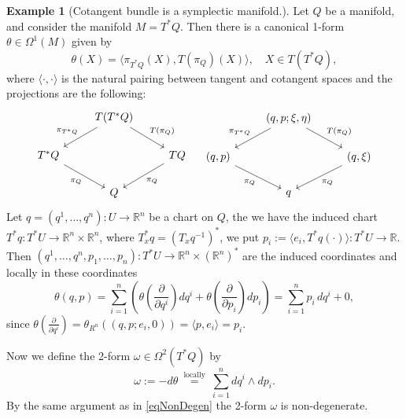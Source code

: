 \documentclass{article}
\numberwithin{theorem}{section}
\theoremstyle{definition}
\newtheorem{example}[theorem]{Example}
\begin{document}
\begin{example}[Cotangent bundle is a symplectic manifold.]
    Let $Q$ be a manifold, and consider the manifold $M = T^*Q$. Then there is a canonical 1-form $\theta \in \Omega^1(M)$ given by 
    \begin{equation}\label{eqTheta1}
        \theta(X) =  \langle \pi_{T^*Q}(X) , T(\pi_Q)(X) \rangle , \quad X \in T(T^*Q),
    \end{equation}
    where $\langle \cdot , \cdot \rangle$ is the natural pairing between tangent and cotangent spaces and the projections are the following:
    \[
    \begin{tikzcd}
        & T(T^*Q) \arrow[ld, "\pi_{T^*Q}"'] \arrow[rd, "T(\pi_Q)"] & \\
        T^*Q \arrow[rd, "\pi_Q"'] & & TQ \arrow[ld, "\pi_Q"] \\
        & Q &
        \end{tikzcd}
        \quad
        \begin{tikzcd}
        & (q, p; \xi, \eta) \arrow[ld, "\pi_{T^*Q}"'] \arrow[rd, "T(\pi_Q)"] & \\
        (q, p) \arrow[rd, "\pi_Q"'] & & (q, \xi) \arrow[ld, "\pi_Q"] \\
        & q &
    \end{tikzcd}
    \]    
    Let $ q = (q^1, \ldots, q^n) : U \to \mathbb{R}^n$ be a chart on $Q$, the we have the induced chart $T^*q : T^*U \to \mathbb{R}^n \times \mathbb{R}^n$, where $T^*_x q = (T_x q^{-1})^*$, we put $p_i := \langle e_i , T^*q(\cdot) \rangle : T^*U \to \mathbb{R}$. Then $(q^1, \ldots, q^n, p_1, \ldots, p_n) : T^*U \to \mathbb{R}^n \times (\mathbb{R}^n)^*$ are the induced coordinates and locally in these coordinates 
    \begin{equation}\label{eqTheta2}
        \theta(q,p) = \sum_{i=1}^n \left( \theta \left( \frac{\partial}{\partial q^i} \right) dq^i + \theta \left( \frac{\partial}{\partial p_i} \right) dp_i \right) = \sum_{i=1}^n p_i \, dq^i + 0,
    \end{equation}
    since $\theta \left( \frac{\partial}{\partial q^i} \right) = \theta_{R^n} \left( (q,p;e_i,0) \right) = \langle p,e_i \rangle = p_i$.

    Now we define the 2-form $\omega \in \Omega^2(T^*Q)$ by 
    \begin{equation}\label{eqCotangentForm}
        \omega := -d \theta \stackrel{\text { locally }}{=} \sum_{i=1}^n d q^i \wedge d p_i.
    \end{equation}
    By the same argument as in \eqref{eqNonDegen} the 2-form $\omega$ is non-degenerate.
\end{example}
\end{document}
